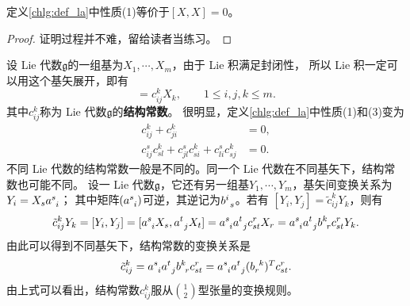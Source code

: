 \begin{proposition}
    定义\ref{chlg:def_la}中性质(1)等价于$[X,X]=0$。
\end{proposition}
\begin{proof}
	证明过程并不难，留给读者当练习。
\end{proof}


设 Lie 代数$\mathfrak{g}$的一组基为$X_1, \cdots ,X_m$，由于 Lie 积满足封闭性，
所以 Lie 积一定可以用这个基矢展开，即有
\begin{equation}
    [X_i, X_j] =c_{ij}^k X_k, \qquad 1 \leqslant i,j,k \leqslant m .
\end{equation}
其中$c_{ij}^k$称为 Lie 代数$\mathfrak{g}$的\textbf{结构常数}。
很明显，定义\ref{chlg:def_la}中性质(1)和(3)变为
\begin{align}
    c_{ij}^k +c_{ji}^k &= 0, \label{chlg:eqn_Cij=Cji} \\
    c_{ij}^s c_{sl}^k + c_{jl}^s c_{si}^k + c_{li}^s c_{sj}^k &=0. \label{chlg:eqn_CCC}
\end{align}
不同 Lie 代数的结构常数一般是不同的。同一个 Lie 代数在不同基矢下，结构常数也可能不同。
设一 Lie 代数$\mathfrak{g}$，它还有另一组基$Y_1, \cdots ,Y_m$，基矢间变换关系为
$    Y_i = X_s a_{\hphantom{s} i}^s  $；
其中矩阵$(a_{\hphantom{s} i}^s)$可逆，其逆记为$b_{\hphantom{s} s}^i$。若有
$    [Y_i, Y_j] =\tilde{c}^{k}_{ij} Y_k $，则有
\begin{equation}
    \tilde{c}^{k}_{ij} Y_k= [Y_i, Y_j] = [a_{\hphantom{s} i}^s X_s, a_{\hphantom{s} j}^t X_t]
    =a_{\hphantom{s} i}^s a_{\hphantom{s} j}^t c_{st}^r X_r
    =a_{\hphantom{s} i}^s a_{\hphantom{s} j}^t b^k_{\hphantom{s} r} c_{st}^r Y_k .
\end{equation}
由此可以得到不同基矢下，结构常数的变换关系是
\begin{equation}\label{chlg:eqn_LAC-trans}
    \tilde{c}^{k}_{ij}  =a_{\hphantom{s} i}^s a_{\hphantom{s} j}^t b^k_{\hphantom{s} r} c_{st}^r 
    =a_{\hphantom{s} i}^s a_{\hphantom{s} j}^t (b^{\hphantom{s} k}_{r})^T c_{st}^r  .
\end{equation}
由上式可以看出，结构常数$c^k_{ij}$服从$\binom{1}{2}$型张量的变换规则。

